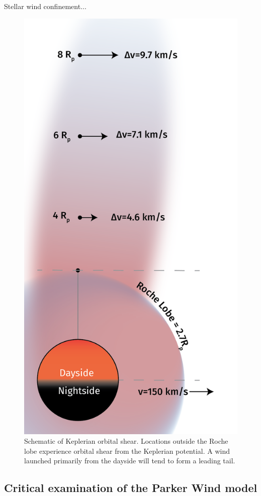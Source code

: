 \documentclass[twocolumn]{aastex631}
\begin{document}
Stellar wind confinement...

\begin{figure}
    \includegraphics[width=0.8\linewidth]{figures/KeplerianShear_v0p3.png}
    \caption{Schematic of Keplerian orbital shear.  Locations outside the Roche lobe experience orbital shear from the Keplerian potential.  A wind launched primarily from the dayside will tend to form a leading tail.}
    \label{fig:KeplerianShear}
\end{figure}

\subsection{Critical examination of the Parker Wind model}
\end{document}

